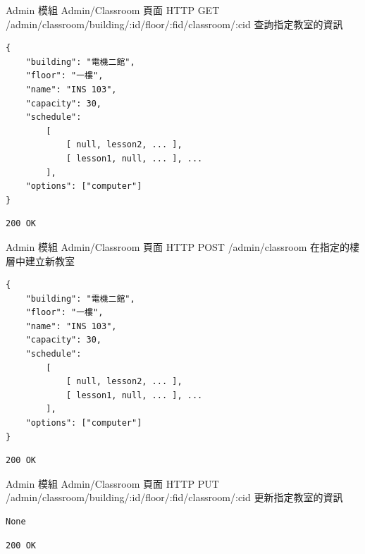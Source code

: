 \documentclass{article}
\begin{document}
{Admin 模組}
{Admin/Classroom 頁面}
{HTTP GET}
{/admin/classroom/building/:id/floor/:fid/classroom/:cid}
{查詢指定教室的資訊}

\bigskip

\begin{lrbox}{\jsoninputbox}
	\begin{lstlisting}[basicstyle=\tiny\ttfamily]
{
	"building": "電機二館",
	"floor": "一樓",
	"name": "INS 103",
	"capacity": 30,
	"schedule":
		[
			[ null, lesson2, ... ],
			[ lesson1, null, ... ], ... 
		],
	"options": ["computer"]
}
\end{lstlisting}
\end{lrbox}

\begin{lrbox}{\jsonoutputbox}
	\begin{lstlisting}
200 OK
\end{lstlisting}
\end{lrbox}

{Admin 模組}
{Admin/Classroom 頁面}
{HTTP POST}
{/admin/classroom}
{在指定的樓層中建立新教室}

\bigskip

\begin{lrbox}{\jsoninputbox}
	\begin{lstlisting}[basicstyle=\tiny\ttfamily]
{
	"building": "電機二館",
	"floor": "一樓",
	"name": "INS 103",
	"capacity": 30,
	"schedule":
		[
			[ null, lesson2, ... ],
			[ lesson1, null, ... ], ... 
		],
	"options": ["computer"]
}
\end{lstlisting}
\end{lrbox}

\begin{lrbox}{\jsonoutputbox}
	\begin{lstlisting}
200 OK
\end{lstlisting}
\end{lrbox}

{Admin 模組}
{Admin/Classroom 頁面}
{HTTP PUT}
{/admin/classroom/building/:id/floor/:fid/classroom/:cid}
{更新指定教室的資訊}

\bigskip

\begin{lrbox}{\jsoninputbox}
	\begin{lstlisting}
None
\end{lstlisting}
\end{lrbox}

\begin{lrbox}{\jsonoutputbox}
	\begin{lstlisting}
200 OK
\end{lstlisting}
\end{lrbox}
\end{document}
